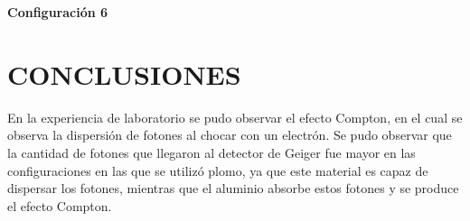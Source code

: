\documentclass[a4paper]{article}
\begin{document}
    \begin{center}
        \textbf{Configuración 6}
    \end{center}

    \section{CONCLUSIONES}

    \indent En la experiencia de laboratorio se pudo observar el efecto Compton, en el cual se observa la dispersión de fotones al chocar con un electrón. Se pudo observar que la cantidad de fotones que llegaron al detector de Geiger fue mayor en las configuraciones en las que se utilizó plomo, ya que este material es capaz de dispersar los fotones, mientras que el aluminio absorbe estos fotones y se produce el efecto Compton.
\end{document}
